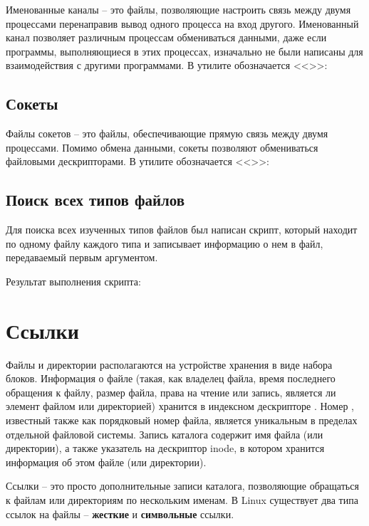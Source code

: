 Именованные каналы -- это файлы, позволяющие настроить связь между двумя процессами перенаправив вывод одного процесса на вход другого. Именованный канал позволяет различным процессам обмениваться данными, даже если программы, выполняющиеся в этих процессах, изначально не были написаны для взаимодействия с другими программами. В утилите  обозначается <<>>:


\subsection{Сокеты}

Файлы сокетов -- это файлы, обеспечивающие прямую связь между двумя процессами. Помимо обмена данными, сокеты позволяют обмениваться файловыми дескрипторами. В утилите  обозначается <<>>:


\subsection{Поиск всех типов файлов}

Для поиска всех изученных типов файлов был написан скрипт, который находит по одному файлу каждого типа и записывает информацию о нем в файл, передаваемый первым аргументом.


Результат выполнения скрипта:


\section{Ссылки}

Файлы и директории располагаются на устройстве хранения в виде набора блоков. Информация о файле (такая, как владелец файла, время последнего обращения к файлу, размер файла, права на чтение или запись, является ли элемент файлом или директорией) хранится в индексном дескрипторе . Номер , известный также как порядковый номер файла, является уникальным в пределах отдельной файловой системы. Запись каталога содержит имя файла (или директории), а также указатель на дескриптор inode, в котором хранится информация об этом файле (или директории).

Ссылки -- это просто дополнительные записи каталога, позволяющие обращаться к файлам или директориям по нескольким именам. В Linux существует два типа ссылок на файлы -- \textbf{жесткие} и \textbf{символьные} ссылки. 

